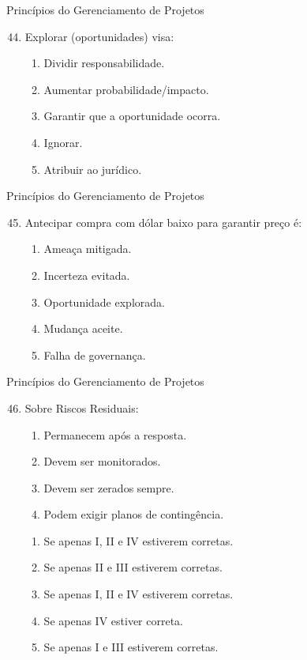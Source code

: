 \documentclass{beamer}
\begin{document}
\begin{frame}{Princípios do Gerenciamento de Projetos}
	\begin{enumerate}
		\setcounter{enumi}{43}
		\justifying
		\item Explorar (oportunidades) visa:
		\begin{enumerate}[a]
			\item Dividir responsabilidade.
			\item Aumentar probabilidade/impacto.
			\item \alert<2>{Garantir que a oportunidade ocorra.}
			\item Ignorar.
			\item Atribuir ao jurídico.
		\end{enumerate}
	\end{enumerate}
\end{frame}

\begin{frame}{Princípios do Gerenciamento de Projetos}
	\begin{enumerate}
		\setcounter{enumi}{44}
		\justifying
		\item Antecipar compra com dólar baixo para garantir preço é:
		\begin{enumerate}[a]
			\item Ameaça mitigada.
			\item Incerteza evitada.
			\item \alert<2>{Oportunidade explorada.}
			\item Mudança aceite.
			\item Falha de governança.
		\end{enumerate}
	\end{enumerate}
\end{frame}

\begin{frame}{Princípios do Gerenciamento de Projetos}
	\begin{enumerate}
		\setcounter{enumi}{45}
		\justifying
		\item Sobre Riscos Residuais:
		\begin{enumerate}[I]
			\item Permanecem após a resposta.
			\item Devem ser monitorados.
			\item Devem ser zerados sempre.
			\item Podem exigir planos de contingência.
		\end{enumerate}
		\begin{enumerate}[a]
			\item Se apenas I, II e IV estiverem corretas.
			\item Se apenas II e III estiverem corretas.
			\item \alert<2>{Se apenas I, II e IV estiverem corretas.}
			\item Se apenas IV estiver correta.
			\item Se apenas I e III estiverem corretas.
		\end{enumerate}
	\end{enumerate}
\end{frame}
\end{document}
